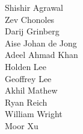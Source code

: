 Shishir Agrawal\\
Zev Chonoles\\
Darij Grinberg\\
Aise Johan de Jong\\
Adeel Ahmad Khan\\
Holden Lee\\
Geoffrey Lee\\
Akhil Mathew\\
Ryan Reich\\
William Wright\\
Moor Xu\\
